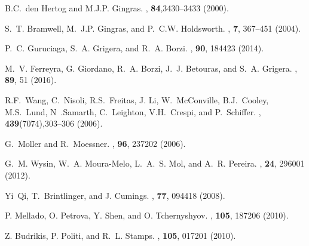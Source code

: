 \documentclass[aps,showkeys,groupedaddress]{revtex4}
\begin{document}
\begin{thebibliography}{39}
B.C.~den Hertog and M.J.P. Gingras.
, {\bf{84}},{3430--3433} {(2000)}.

S.~T. Bramwell, M.~J.P. Gingras, and P.~C.W. Holdsworth.
, {\bf{7}}, 367--451 (2004).

P.~C. Guruciaga, S.~A. Grigera, and R.~A. Borzi.
, {\bf{90}}, 184423 {(2014)}.

M.~V. Ferreyra, G. Giordano, R.~A. Borzi, J.~J. Betouras, and
  S.~A. Grigera.
, {\bf{89}}, 51 {(2016)}.

R.F.~Wang, C.~Nisoli, R.S.~Freitas, J. Li, W.~McConville, B.J.~Cooley, M.S.~Lund,
  N~.Samarth, C.~Leighton, V.H.~Crespi, and P.~Schiffer.
, {\bf{439}}({7074}),{303--306} {(2006)}.

G.~Moller and R.~Moessner.
, {\bf{96}}, 237202 {(2006)}.

G.~M. Wysin, W.~A. Moura-Melo, L.~A.~S. Mol, and A.~R. Pereira.
, {\bf{24}}, 296001 {(2012)}.

Yi~Qi, T.~Brintlinger, and J. Cumings.
, {\bf{77}}, 094418 {(2008)}.

P. Mellado, O. Petrova, Y. Shen, and O. Tchernyshyov.
, {\bf{105}}, 187206 {(2010)}.

Z. Budrikis, P. Politi, and R.~L. Stamps.
, {\bf{105}}, 017201 {(2010)}.


\end{thebibliography}
\end{document}
